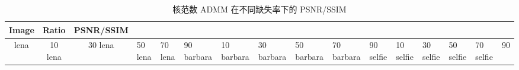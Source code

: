 \begin{table}[htbp]
\centering
\caption{核范数 ADMM 在不同缺失率下的 PSNR/SSIM}
\label{tab:chapter2_missing}
\small
\begin{tabular}{|c|c|c|}
\hline
Image & Ratio & PSNR/SSIM \\
\hline
lena & 10%
lena & 30%
lena & 50%
lena & 70%
lena & 90%
barbara & 10%
barbara & 30%
barbara & 50%
barbara & 70%
barbara & 90%
selfie & 10%
selfie & 30%
selfie & 50%
selfie & 70%
selfie & 90%
\hline
\end{tabular}
\end{table}
